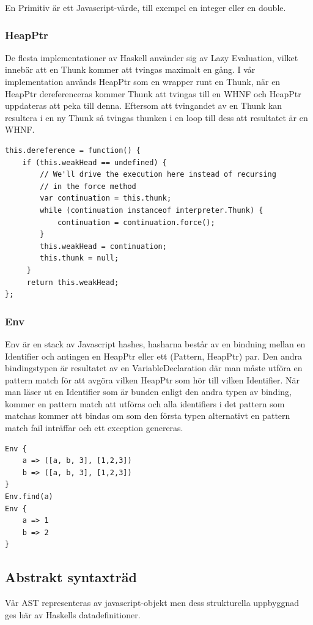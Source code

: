 En Primitiv är ett Javascript-värde, till exempel en integer eller en double.

\subsubsection{HeapPtr}
De flesta implementationer av Haskell använder sig av Lazy Evaluation, vilket innebär att en Thunk kommer att tvingas maximalt en gång. I vår implementation används HeapPtr som en wrapper runt en Thunk, när en HeapPtr dereferenceras kommer Thunk att tvingas till en WHNF och HeapPtr uppdateras att peka till denna. Eftersom att tvingandet av en Thunk kan resultera i en ny Thunk så tvingas thunken i en loop till dess att resultatet är en WHNF.

\begin{lstlisting}
this.dereference = function() {
    if (this.weakHead == undefined) {
        // We'll drive the execution here instead of recursing 
        // in the force method
        var continuation = this.thunk;
        while (continuation instanceof interpreter.Thunk) {
            continuation = continuation.force();
        }
        this.weakHead = continuation;
        this.thunk = null;
     }
     return this.weakHead;
};
\end{lstlisting}

\subsubsection{Env}
Env är en stack av Javascript hashes, hasharna består av en bindning mellan en Identifier och antingen en HeapPtr eller ett (Pattern, HeapPtr) par.  Den andra bindingstypen är resultatet av en VariableDeclaration där man måste utföra en pattern match för att avgöra vilken HeapPtr som hör till vilken Identifier. När man läser ut en Identifier som är bunden enligt den andra typen av binding,  kommer en pattern match att utföras och alla identifiers i det pattern som matchas kommer att bindas om som den första typen alternativt en pattern match fail inträffar och ett exception genereras.

\begin{lstlisting}
Env {
    a => ([a, b, 3], [1,2,3])
    b => ([a, b, 3], [1,2,3])
}
Env.find(a)
Env {
    a => 1
    b => 2
}
\end{lstlisting}

\subsection{Abstrakt syntaxträd} 
Vår AST representeras av javascript-objekt men dess strukturella uppbyggnad ges här av Haskells datadefinitioner.

